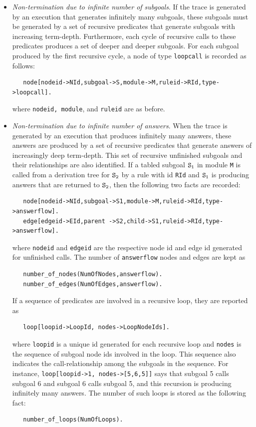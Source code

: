 \documentclass[11pt]{article}
\begin{document}
\begin{itemize}
\item \emph{Non-termination due to infinite number of subgoals}. 
  If the trace is generated by an execution that
  generates infinitely many
  subgoals, these subgoals must be generated by a set of
  recursive predicates that generate subgoals with increasing term-depth.
  Furthermore, each cycle of recursive calls to these predicates
  produces a set of deeper and deeper subgoals.
  For each subgoal produced by the first recursive cycle,
  a node of type {\tt loopcall} is recorded as follows:
\begin{verbatim}
   node[nodeid->NId,subgoal->S,module->M,ruleid->RId,type->loopcall].
\end{verbatim}
  where {\tt nodeid, module}, and {\tt ruleid} are as before.
  
\item \emph{Non-termination due to infinite number of answers}. 
  When the trace is generated by an execution that produces
  infinitely many answers, these answers are produced by a set of
  recursive predicates that generate answers of increasingly deep
  term-depth.
  This set of recursive unfinished subgoals and their relationships
  are also identified. 
  If a tabled subgoal $\tt S_1$ in module {\tt M} is called from a
  derivation tree for $\tt S_2$ by a rule with id
  {\tt RId} and $\tt S_1$ is producing answers that are returned to
  $\tt S_2$, then the following two facts are recorded:
\begin{verbatim}
   node[nodeid->NId,subgoal->S1,module->M,ruleid->RId,type->answerflow].
   edge[edgeid->EId,parent ->S2,child->S1,ruleid->RId,type->answerflow].
\end{verbatim}
  where {\tt nodeid} and {\tt edgeid} are the respective node id and
  edge id generated for unfinished calls. 
  The number of {\tt answerflow} nodes and edges are kept as
\begin{verbatim}
   number_of_nodes(NumOfNodes,answerflow).
   number_of_edges(NumOfEdges,answerflow).
\end{verbatim}

  If a sequence of predicates are involved in a recursive loop, they
  are reported as 
\begin{verbatim}
   loop[loopid->LoopId, nodes->LoopNodeIds].
\end{verbatim}
  where {\tt loopid} is a unique id generated for each recursive loop
  and {\tt nodes} is the sequence of subgoal node ids involved in the loop.
  This sequence also indicates the call-relationship among the subgoals in
  the sequence. 
  For instance, {\tt loop[loopid->1, nodes->[5,6,5]]} says
  that subgoal 5 calls subgoal 6 and subgoal 6 calls subgoal 5, and
  this recursion is producing infinitely many answers. 
  The number of such loops is stored as the following fact:
\begin{verbatim}
   number_of_loops(NumOfLoops).
\end{verbatim}
\end{itemize}
\end{document}
